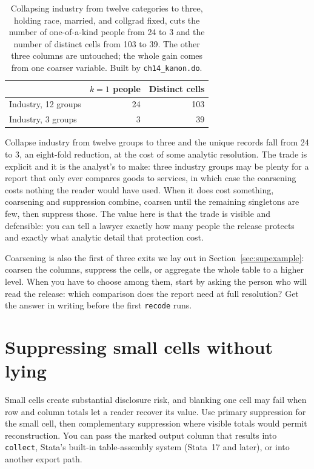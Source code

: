 \documentclass[
    a4paper,
    fontsize=10pt,
    twoside=true,
    numbers=noenddot,
]{kaobook}
\begin{document}
\begin{table}[htbp]
\centering
{\footnotesize
\begin{tabular}{lrr}
\hline
                       & $k=1$ people & Distinct cells \\
\hline
Industry, 12 groups    & 24 & 103 \\
Industry, 3 groups     &  3 &  39 \\
\hline
\end{tabular}
}
\caption[Coarsening industry collapses unique records]{Collapsing industry from twelve categories to three, holding race, married, and collgrad fixed, cuts the number of one-of-a-kind people from 24 to 3 and the number of distinct cells from 103 to 39. The other three columns are untouched; the whole gain comes from one coarser variable. Built by \texttt{ch14\_kanon.do}.}
\label{tab:coarsen}
\end{table}

Collapse industry from twelve groups to three and the unique records fall from 24 to 3, an eight-fold reduction, at the cost of some analytic resolution.  The trade is explicit and it is the analyst's to make: three industry groups may be plenty for a report that only ever compares goods to services, in which case the coarsening costs nothing the reader would have used. When it does cost something, coarsening and suppression combine, coarsen until the remaining singletons are few, then suppress those. The value here is that the trade is visible and defensible: you can tell a lawyer exactly how many people the release protects and exactly what analytic detail that protection cost.

Coarsening is also the first of three exits we lay out in Section~\ref{sec:supexample}: coarsen the columns, suppress the cells, or aggregate the whole table to a higher level. When you have to choose among them, start by asking the person who will read the release: which comparison does the report need at full resolution? Get the answer in writing before the first \texttt{recode} runs.

\section{Suppressing small cells without lying}\label{sec:suppress}
Small cells create substantial disclosure risk, and blanking one cell may fail when row and column totals let a reader recover its value. Use primary suppression for the small cell, then complementary suppression where visible totals would permit reconstruction. You can pass the marked output column that results into \texttt{collect}, Stata's built-in table-assembly system (Stata~17 and later), or into another export path.
\end{document}
